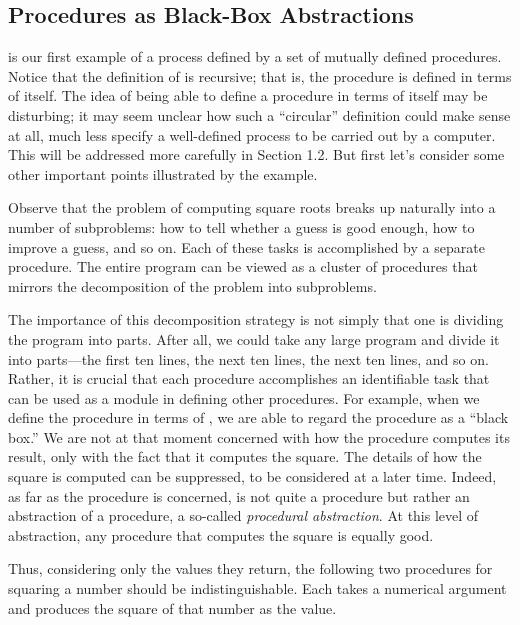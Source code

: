 \subsection{Procedures as Black-Box Abstractions}

 is our first example of a process defined by a set of mutually defined procedures. Notice that the definition of  is recursive; that is, the procedure is defined in terms of itself. The idea of being able to define a procedure in terms of itself may be disturbing; it may seem unclear how such a ``circular'' definition could make sense at all, much less specify a well-defined process to be carried out by a computer. This will be addressed more carefully in Section 1.2. But first let's consider some other important points illustrated by the  example.

Observe that the problem of computing square roots breaks up naturally into a number of subproblems: how to tell whether a guess is good enough, how to improve a guess, and so on. Each of these tasks is accomplished by a separate procedure. The entire  program can be viewed as a cluster of procedures that mirrors the decomposition of the problem into subproblems.

The importance of this decomposition strategy is not simply that one is dividing the program into parts. After all, we could take any large program and divide it into parts---the first ten lines, the next ten lines, the next ten lines, and so on. Rather, it is crucial that each procedure accomplishes an identifiable task that can be used as a module in defining other procedures. For example, when we define the  procedure in terms of , we are able to regard the  procedure as a ``black box.'' We are not at that moment concerned with how the procedure computes its result, only with the fact that it computes the square. The details of how the square is computed can be suppressed, to be considered at a later time. Indeed, as far as the  procedure is concerned,  is not quite a procedure but rather an abstraction of a procedure, a so-called \textit{procedural abstraction}. At this level of abstraction, any procedure that computes the square is equally good.

Thus, considering only the values they return, the following two procedures for squaring a number should be indistinguishable. Each takes a numerical argument and produces the square of that number as the value.

